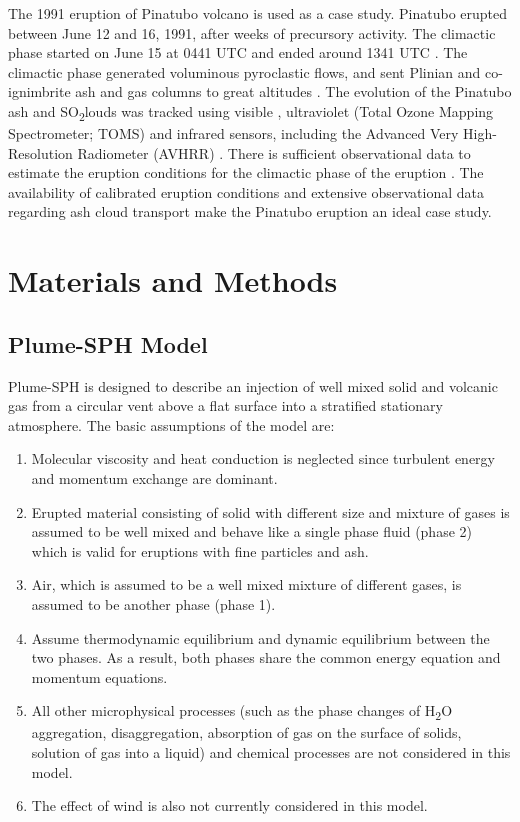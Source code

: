 \documentclass[utf8]{frontiersSCNS} %
\begin{document}
The 1991 eruption of Pinatubo volcano is used as a case study. Pinatubo erupted between June 12 and 16, 1991, after weeks of precursory activity. The climactic phase started on June 15 at 0441 UTC and ended around 1341 UTC \citep{holasek1996satellite}. The climactic phase generated voluminous pyroclastic flows, and sent Plinian and co-ignimbrite ash and gas columns to great altitudes \citep{scott1996pyroclastic}. The evolution of the Pinatubo ash and \texorpdfstring{SO\textsubscript{2}} clouds was tracked using visible \citep{holasek1996satellite}, ultraviolet (Total Ozone Mapping Spectrometer; TOMS) \citep{guo2004re} and infrared sensors, including the Advanced Very High-Resolution Radiometer (AVHRR) \citep{guo2004particles}. There is sufficient observational data to estimate the eruption conditions for the climactic phase of the eruption \citep{suzuki2009three}. The availability of calibrated eruption conditions and extensive observational data regarding ash cloud transport make the Pinatubo eruption an ideal case study.

\section{Materials and Methods} \label{sec:Methodology}

\subsection {Plume-SPH Model} \label{sec:plume-sph}
Plume-SPH  \citep{cao2018plume} is designed to describe an injection of well mixed solid and volcanic gas from a circular vent above a flat surface into a stratified stationary atmosphere. The basic assumptions of the model are: 
\begin{enumerate}
\item Molecular viscosity and heat conduction is neglected since turbulent energy and momentum exchange are dominant.
\item Erupted material consisting of solid with different size and mixture of gases  is assumed to be well mixed and behave like a single phase fluid (phase 2) which is valid for eruptions with fine particles and ash.
\item Air, which is assumed to be a well mixed mixture of different gases, is assumed to be another phase (phase 1).
\item Assume thermodynamic equilibrium and dynamic equilibrium between the two phases. As a result, both phases share the common energy equation and momentum equations.
\item All other microphysical processes (such as the phase changes of \texorpdfstring{H\textsubscript{2}O}, aggregation, disaggregation, absorption of gas on the surface of solids, solution of gas into a liquid) and chemical processes are not considered in this model.
\item The effect of wind is also not currently considered in this model. 
\end{enumerate}
\end{document}
